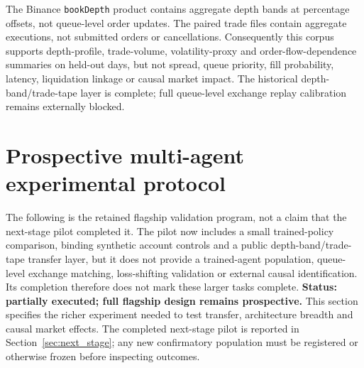\documentclass[11pt,a4paper]{article}
\theoremstyle{definition}
\theoremstyle{remark}
\begin{document}
The Binance \texttt{bookDepth} product contains aggregate depth bands at percentage offsets, not queue-level order updates. The paired trade files contain aggregate executions, not submitted orders or cancellations. Consequently this corpus supports depth-profile, trade-volume, volatility-proxy and order-flow-dependence summaries on held-out days, but not spread, queue priority, fill probability, latency, liquidation linkage or causal market impact. The historical depth-band/trade-tape layer is complete; full queue-level exchange replay calibration remains externally blocked.

\section{Prospective multi-agent experimental protocol}
The following is the retained flagship validation program, not a claim that the next-stage pilot completed it. The pilot now includes a small trained-policy comparison, binding synthetic account controls and a public depth-band/trade-tape transfer layer, but it does not provide a trained-agent population, queue-level exchange matching, loss-shifting validation or external causal identification. Its completion therefore does not mark these larger tasks complete.
\label{sec:experiments}
\textbf{Status: partially executed; full flagship design remains prospective.} This section specifies the richer experiment needed to test transfer, architecture breadth and causal market effects. The completed next-stage pilot is reported in Section~\ref{sec:next_stage}; any new confirmatory population must be registered or otherwise frozen before inspecting outcomes.
\end{document}
